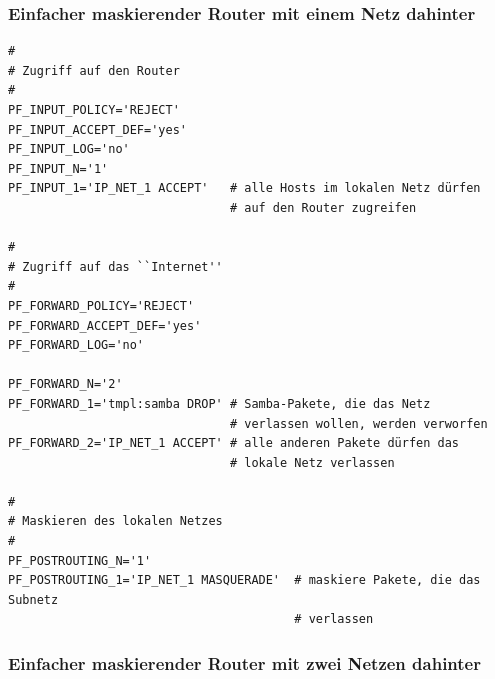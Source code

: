\subsubsection{Einfacher maskierender Router mit einem Netz dahinter}

\begin{example}
\begin{verbatim}
#
# Zugriff auf den Router
#
PF_INPUT_POLICY='REJECT'
PF_INPUT_ACCEPT_DEF='yes'
PF_INPUT_LOG='no'
PF_INPUT_N='1'
PF_INPUT_1='IP_NET_1 ACCEPT'   # alle Hosts im lokalen Netz dürfen
                               # auf den Router zugreifen

#
# Zugriff auf das ``Internet''
#
PF_FORWARD_POLICY='REJECT'
PF_FORWARD_ACCEPT_DEF='yes'
PF_FORWARD_LOG='no'

PF_FORWARD_N='2'
PF_FORWARD_1='tmpl:samba DROP' # Samba-Pakete, die das Netz
                               # verlassen wollen, werden verworfen
PF_FORWARD_2='IP_NET_1 ACCEPT' # alle anderen Pakete dürfen das
                               # lokale Netz verlassen

#
# Maskieren des lokalen Netzes
#
PF_POSTROUTING_N='1'
PF_POSTROUTING_1='IP_NET_1 MASQUERADE'  # maskiere Pakete, die das Subnetz
                                        # verlassen
\end{verbatim}
\end{example}

\subsubsection{Einfacher maskierender Router mit zwei Netzen dahinter}

